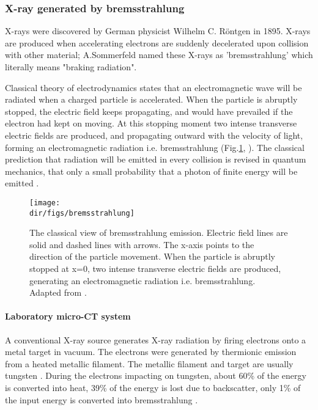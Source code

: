 \subsubsection{X-ray generated by bremsstrahlung}
X-rays were discovered by German physicist Wilhelm C. R\"{o}ntgen in 1895. X-rays are produced when accelerating electrons are suddenly decelerated upon collision with other material; A.Sommerfeld named these X-rays as 'bremsstrahlung' which literally means "braking radiation". 

Classical theory of electrodynamics states that an electromagnetic wave will be radiated when a charged particle is accelerated. When the particle is abruptly stopped, the electric field keeps propagating, and would have prevailed if the electron had kept on moving. At this stopping moment two intense transverse electric fields are produced, and propagating outward with the velocity of light, forming an electromagnetic radiation i.e. bremsstrahlung (Fig.\ref{bremsstrahlung}, \citep{haug2004elementary}). The classical prediction that radiation will be emitted in every collision is revised in quantum mechanics, that only a small probability that a photon of finite energy will be emitted \citep{haug2004elementary}.

\begin{figure}[htbp]
  \centering
  \texttt{[image: \\dir/figs/bremsstrahlung]}
  \caption{The classical view of bremsstrahlung emission. Electric field lines are solid and dashed lines with arrows. The x-axis points to the direction of the particle movement. When the particle is abruptly stopped at x=0, two intense transverse electric fields are produced, generating an electromagnetic radiation i.e. bremsstrahlung. Adapted from \citet{haug2004elementary,asg1966berkeley}.}
  \label{bremsstrahlung}
\end{figure}

\paragraph{Laboratory micro-CT system}
A conventional X-ray source generates X-ray radiation by firing electrons onto a metal target in vacuum. The electrons were generated by thermionic emission from a heated metallic filament. The metallic filament and target are usually tungsten \citep{wildenschild2013x}. During the electrons impacting on tungsten, about 60\% of the energy is converted into heat, 39\% of the energy is lost due to backscatter, only 1\% of the input energy is converted into bremsstrahlung \citep{behling2015modern}.

